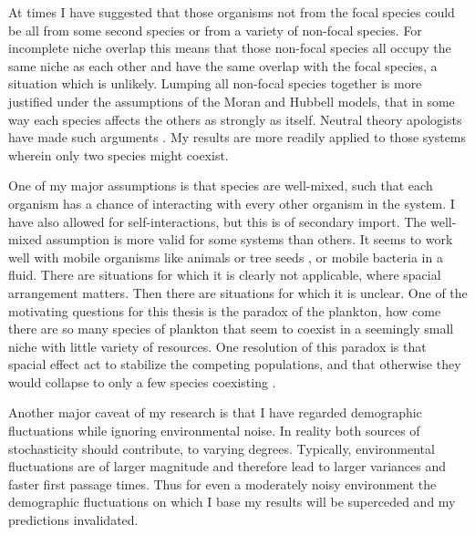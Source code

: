 At times I have suggested that those organisms not from the focal species could be all from some second species or from a variety of non-focal species. 
For incomplete niche overlap this means that those non-focal species all occupy the same niche as each other and have the same overlap with the focal species, a situation which is unlikely. 
Lumping all non-focal species together is more justified under the assumptions of the Moran and Hubbell models, that in some way each species affects the others as strongly as itself. 
Neutral theory apologists have made such arguments \cite{???}. 
My results are more readily applied to those systems wherein only two species might coexist. 

One of my major assumptions is that species are well-mixed, such that each organism has a chance of interacting with every other organism in the system. 
I have also allowed for self-interactions, but this is of secondary import. 
The well-mixed assumption is more valid for some systems than others. 
It seems to work well with mobile organisms like animals or tree seeds \cite{???}, or mobile bacteria in a fluid. 
There are situations for which it is clearly not applicable, where spacial arrangement matters. 
Then there are situations for which it is unclear. 
One of the motivating questions for this thesis is the paradox of the plankton, how come there are so many species of plankton that seem to coexist in a seemingly small niche with little variety of resources. 
One resolution of this paradox is that spacial effect act to stabilize the competing populations, and that otherwise they would collapse to only a few species coexisting \cite{May???}. 

Another major caveat of my research is that I have regarded demographic fluctuations while ignoring environmental noise. 
In reality both sources of stochasticity should contribute, to varying degrees. 
Typically, environmental fluctuations are of larger magnitude and therefore lead to larger variances and faster first passage times. 
Thus for even a moderately noisy environment the demographic fluctuations on which I base my results will be superceded and my predictions invalidated. 

